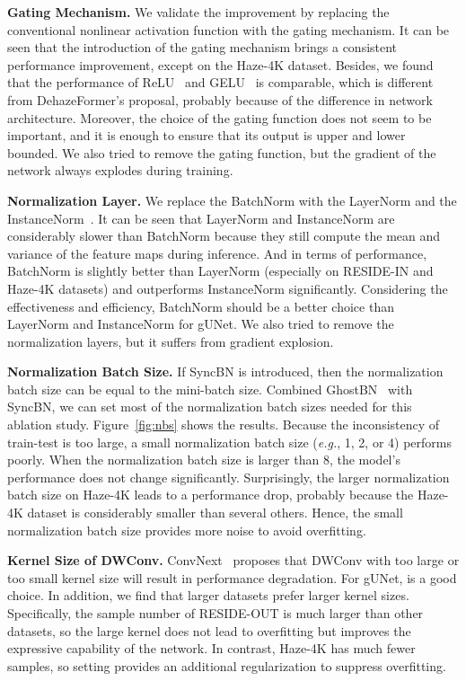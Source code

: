 \documentclass[10pt,twocolumn,letterpaper]{article}
\begin{document}
\noindent\textbf{Gating Mechanism.}
We validate the improvement by replacing the conventional nonlinear activation function with the gating mechanism.
It can be seen that the introduction of the gating mechanism brings a consistent performance improvement, except on the Haze-4K dataset.
Besides, we found that the performance of ReLU~\cite{nair2010rectified} and GELU~\cite{hendrycks2016gaussian} is comparable, which is different from DehazeFormer's proposal, probably because of the difference in network architecture.
Moreover, the choice of the gating function does not seem to be important, and it is enough to ensure that its output is upper and lower bounded.
We also tried to remove the gating function, but the gradient of the network always explodes during training. 

\noindent\textbf{Normalization Layer.}
We replace the BatchNorm with the LayerNorm and the InstanceNorm~\cite{ulyanov2016instance}.
It can be seen that LayerNorm and InstanceNorm are considerably slower than BatchNorm because they still compute the mean and variance of the feature maps during inference.
And in terms of performance, BatchNorm is slightly better than LayerNorm (especially on RESIDE-IN and Haze-4K datasets) and outperforms InstanceNorm significantly.
Considering the effectiveness and efficiency, BatchNorm should be a better choice than LayerNorm and InstanceNorm for gUNet.
We also tried to remove the normalization layers, but it suffers from gradient explosion.

\noindent\textbf{Normalization Batch Size.}
If SyncBN is introduced, then the normalization batch size can be equal to the mini-batch size.
Combined GhostBN~\cite{hoffer2017train} with SyncBN, we can set most of the normalization batch sizes needed for this ablation study.
Figure~\ref{fig:nbs} shows the results.
Because the inconsistency of train-test is too large, a small normalization batch size (\emph{e.g.}, 1, 2, or 4) performs poorly.
When the normalization batch size is larger than 8, the model's performance does not change significantly.
Surprisingly, the larger normalization batch size on Haze-4K leads to a performance drop, probably because the Haze-4K dataset is considerably smaller than several others. 
Hence, the small normalization batch size provides more noise to avoid overfitting.

\noindent\textbf{Kernel Size of DWConv.}
ConvNext~\cite{liu2022convnet} proposes that DWConv with too large or too small kernel size will result in performance degradation.
For gUNet,  is a good choice.
In addition, we find that larger datasets prefer larger kernel sizes.
Specifically, the sample number of RESIDE-OUT is much larger than other datasets, so the large kernel does not lead to overfitting but improves the expressive capability of the network.
In contrast, Haze-4K has much fewer samples, so setting  provides an additional regularization to suppress overfitting.
\end{document}
